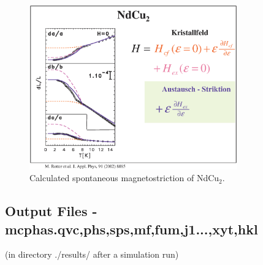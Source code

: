 \begin{figure}[t]%
\begin{center}\leavevmode
\includegraphics[angle=0, width=0.8\textwidth]{figsrc/magnetostriction_ndcu2.eps}
\end{center}
\caption{Calculated spontaneous magnetostriction of NdCu$_2$.}
\label{magnetostrictiongraphic}
\end{figure}

\subsection{Output Files - {\prg mcphas.qvc,phs,sps,mf,fum,j1...,xyt,hkl} }\label{outputfiles}
 (in directory ./results/ after a simulation run) 


